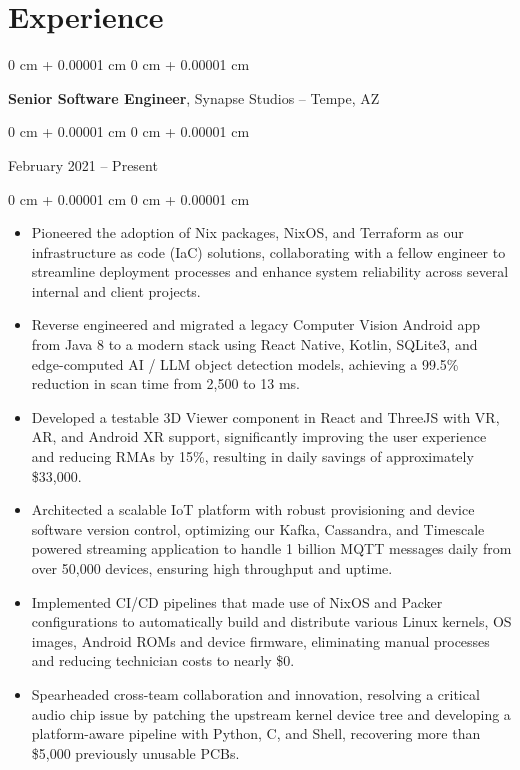 \documentclass[10pt, letterpaper]{article}
\newenvironment{highlights}{
    \begin{itemize}[
        topsep=0.10 cm,
        parsep=0.10 cm,
        partopsep=0pt,
        itemsep=0pt,
        leftmargin=0 cm + 10pt
    ]
}{
    \end{itemize}
} %
\newenvironment{onecolentry}{
    \begin{adjustwidth}{
        0 cm + 0.00001 cm
    }{
        0 cm + 0.00001 cm
    }
}{
    \end{adjustwidth}
} %
\begin{document}
\vspace{0.2 cm}

\section{Experience}
\begin{onecolentry}
    \textbf{Senior Software Engineer}, Synapse Studios -- Tempe, AZ
\end{onecolentry}
\begin{onecolentry}
    February 2021 – Present
\end{onecolentry}

\vspace{0.10 cm}
\begin{onecolentry}
    \begin{highlights}
        \item Pioneered the adoption of Nix packages, NixOS, and Terraform as our infrastructure as code (IaC) solutions, collaborating with a fellow engineer to streamline deployment processes and enhance system reliability across several internal and client projects.
        \item Reverse engineered and migrated a legacy Computer Vision Android app from Java 8 to a modern stack using React Native, Kotlin, SQLite3, and edge-computed AI / LLM object detection models, achieving a 99.5\% reduction in scan time from 2,500 to 13 ms.
        \item Developed a testable 3D Viewer component in React and ThreeJS with VR, AR, and Android XR support, significantly improving the user experience and reducing RMAs by 15\%, resulting in daily savings of approximately \$33,000.
        \item Architected a scalable IoT platform with robust provisioning and device software version control, optimizing our Kafka, Cassandra, and Timescale powered streaming application to handle 1 billion MQTT messages daily from over 50,000 devices, ensuring high throughput and uptime.
        \item Implemented CI/CD pipelines that made use of NixOS and Packer configurations to automatically build and distribute various Linux kernels, OS images, Android ROMs and device firmware, eliminating manual processes and reducing technician costs to nearly \$0.
        \item Spearheaded cross-team collaboration and innovation, resolving a critical audio chip issue by patching the upstream kernel device tree and developing a platform-aware pipeline with Python, C, and Shell, recovering more than \$5,000 previously unusable PCBs.
    \end{highlights}
\end{onecolentry}
\end{document}
